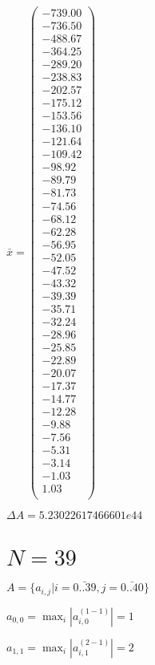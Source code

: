 \documentclass[a4paper,12pt]{article}
\begin{document}
$\bar { x } = \begin{pmatrix}
-739.00 \\
-736.50 \\
-488.67 \\
-364.25 \\
-289.20 \\
-238.83 \\
-202.57 \\
-175.12 \\
-153.56 \\
-136.10 \\
-121.64 \\
-109.42 \\
-98.92 \\
-89.79 \\
-81.73 \\
-74.56 \\
-68.12 \\
-62.28 \\
-56.95 \\
-52.05 \\
-47.52 \\
-43.32 \\
-39.39 \\
-35.71 \\
-32.24 \\
-28.96 \\
-25.85 \\
-22.89 \\
-20.07 \\
-17.37 \\
-14.77 \\
-12.28 \\
-9.88 \\
-7.56 \\
-5.31 \\
-3.14 \\
-1.03 \\
1.03 \\
\end{pmatrix}
$

$\Delta A = 5.23022617466601e44$



\section{ $N = 39$ }
$A = \{ a _{ i, j } | i = \bar { 0..39 }, j = \bar { 0..40 } \}$

$a _{ 0, 0 } =  \max _i |a _{ i, 0 } ^{ (1 - 1) } | = 1$

$a _{ 1, 1 } =  \max _i |a _{ i, 1 } ^{ (2 - 1) } | = 2$
\end{document}
